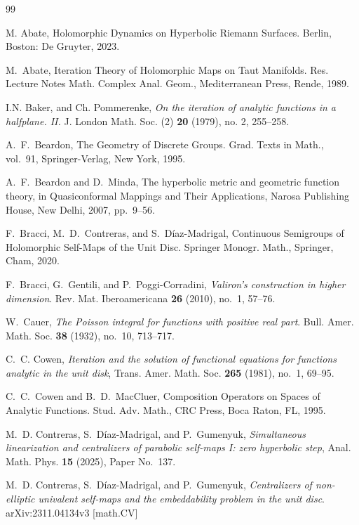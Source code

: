 \documentclass[12pt]{amsart}
\numberwithin{equation}{section}
\theoremstyle{plain}
\theoremstyle{definition}
\begin{document}
\begin{thebibliography}{99}

M. Abate, Holomorphic Dynamics on Hyperbolic Riemann Surfaces. Berlin, Boston: De Gruyter, 2023.


M.~Abate,
Iteration Theory of Holomorphic Maps on Taut Manifolds.
Res. Lecture Notes Math. Complex Anal. Geom.,
Mediterranean Press, Rende, 1989.

I.N. Baker, and Ch. Pommerenke,
\textit{On the iteration of analytic functions in a halfplane. II.}
J. London Math. Soc. (2) \textbf{20} (1979), no. 2, 255--258.

A.~F.~Beardon,
The Geometry of Discrete Groups.
Grad. Texts in Math., vol.~91,
Springer-Verlag, New York, 1995.

A.~F.~Beardon and D.~Minda,
The hyperbolic metric and geometric function theory,
in Quasiconformal Mappings and Their Applications,
Narosa Publishing House, New Delhi, 2007, pp.~9--56.

F.~Bracci, M.~D.~Contreras, and S.~D\'iaz-Madrigal,
Continuous Semigroups of Holomorphic Self-Maps of the Unit Disc.
Springer Monogr. Math.,
Springer, Cham, 2020.

F.~Bracci, G.~Gentili, and P.~Poggi-Corradini,
\textit{Valiron's construction in higher dimension}. Rev. Mat. Iberoamericana \textbf{26} (2010), no.~1, 57--76.

W.~Cauer,
\textit{The Poisson integral for functions with positive real part}. Bull. Amer. Math. Soc. \textbf{38} (1932), no.~10, 713--717.

C.~C. Cowen,
\emph{Iteration and the solution of functional equations for functions analytic in the unit disk},
Trans. Amer. Math. Soc. \textbf{265} (1981), no.~1, 69--95.

C.~C.~Cowen and B.~D.~MacCluer,
Composition Operators on Spaces of Analytic Functions.
Stud. Adv. Math.,
CRC Press, Boca Raton, FL, 1995.

M.~D. Contreras, S.~D\'iaz-Madrigal, and P.~Gumenyuk,
\emph{Simultaneous linearization and centralizers of parabolic self-maps I: zero hyperbolic step},
Anal. Math. Phys. \textbf{15} (2025), Paper No.~137.

M.~D. Contreras, S.~D\'iaz-Madrigal, and P.~Gumenyuk,
\textit{Centralizers of non-elliptic univalent self-maps and the embeddability problem in the unit disc}. arXiv:2311.04134v3 [math.CV]


\end{thebibliography}
\end{document}
